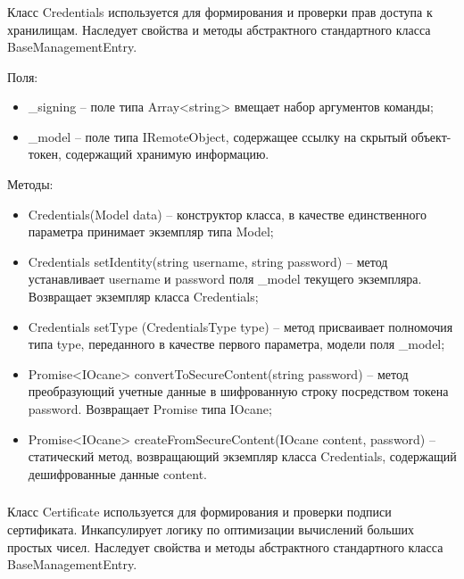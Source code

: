 \subsubsection{}
\label{sub:arch_and_mod:probab_net:credentials}

Класс Credentials используется для формирования и проверки прав доступа к хранилищам. Наследует свойства и методы абстрактного стандартного класса BaseManagementEntry.

Поля:
\begin{itemize}
  \item \_signing – поле типа Array<string> вмещает набор аргументов команды;
  \item \_model – поле типа IRemoteObject, содержащее ссылку на скрытый объект-токен, содержащий хранимую информацию.
\end{itemize}

Методы:
\begin{itemize}
  \item Credentials(Model data) – конструктор класса, в качестве единственного параметра принимает экземпляр типа Model;
  \item Credentials setIdentity(string username, string password) – метод устанавливает username и password поля \_model текущего экземпляра. Возвращает экземпляр класса Credentials;
  \item Credentials setType (CredentialsType type) – метод присваивает полномочия типа type, переданного в качестве первого параметра, модели поля \_model;
  \item Promise<IOcane> convertToSecureContent(string password) – метод преобразующий учетные данные в шифрованную строку посредством токена password. Возвращает Promise типа IOcane;
  \item Promise<IOcane> createFromSecureContent(IOcane content, password) – статический метод, возвращающий экземпляр класса Credentials, содержащий дешифрованные данные content.
\end{itemize}

\subsubsection{}
\label{sub:arch_and_mod:probab_net:certificate}

Класс Certificate используется для формирования и проверки подписи сертификата. Инкапсулирует логику по оптимизации вычислений больших простых чисел. Наследует свойства и методы абстрактного стандартного класса BaseManagementEntry.

